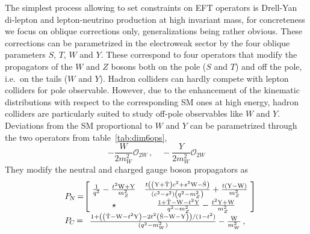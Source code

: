 The simplest process allowing to set constraints on EFT operators is Drell-Yan di-lepton and lepton-neutrino production at high invariant mass, for concreteness we focus on oblique corrections only, generalizations being rather obvious. These corrections can be parametrized in the electroweak sector by the four oblique parameters $S$, $T$, $W$ and $Y$. These correspond to four operators that modify the propagators of the $W$ and $Z$ bosons both on the pole ($S$ and $T$) and off the pole, i.e.~on the tails ($W$ and $Y$). Hadron colliders can hardly compete with lepton colliders for pole observable. However, due to the enhancement of the kinematic distributions with respect to the corresponding SM ones at high energy, hadron colliders are particularly suited to study off-pole observables like $W$ and $Y$. Deviations from the SM proportional to $W$ and $Y$ can be parametrized through the two operators from table~\ref{tab:dim6ops},
\begin{equation}
 -\frac{W}{2m_W^2}\mathcal{O}_{2W}   \,, \quad  -\frac{Y}{2m_W^2}\mathcal{O}_{2W}   
 \end{equation}
They modify the neutral and charged gauge boson propagators as
\begin{equation}\label{eq:propagators}
\begin{array}{ll}
& P_{\hspace{-1pt}{N}}\hspace{-1pt} = \hspace{-2.5pt}\left[\hspace{-2pt}
\begin{array}{cc}
 \frac{1}{q^2}-\frac{t^{2}{\rm{\sc{W}}}+{\rm{\sc{Y}}}}{m_Z^2} & \frac{t \left(\left({\rm{\sc{Y}}}+{\rm\hat{T}}\right) c^2+s^2 {\rm{\sc{W}}}-{\rm\hat{S}}\right)}{\left(c^2-s^2\right) \left(q^2-m_Z^2\right)}+\frac{t ({\rm{\sc{Y}}}-{\rm{\sc{W}}})}{m_Z^2} \\
 \star & \frac{1+ {\rm\hat{T}}-{\rm{\sc{W}}}-t^{2}{\rm{\sc{Y}}}}{q^2-m_Z^2}-\frac{t^{2}{\rm{\sc{Y}}}+{\rm{\sc{W}}}}{m_Z^2} \\
\end{array}
\hspace{-2pt}
\right] \\
& P_{\hspace{-1pt}{C}}\hspace{-1pt} =
\begin{array}{c}
\frac{1+\left( \left({\rm\hat{T}}-{\rm{\sc{W}}}-t^2 {\rm{\sc{Y}}}\right)-2 t^2 \left({\rm\hat{S}}-{\rm{\sc{W}}}-{\rm{\sc{Y}}}\right)\right)/(1-t^2)}{(q^{2}-m_W^2)}-\frac{{\rm{\sc{W}}}}{m_W^2}\,,
\end{array}
\end{array}
\end{equation}
